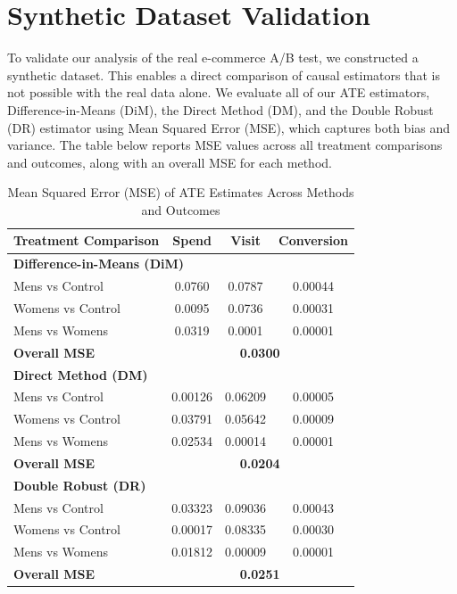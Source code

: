 \documentclass[10pt]{article}
\begin{document}
\section{Synthetic Dataset Validation}
To validate our analysis of the real e-commerce A/B test, we constructed a synthetic
dataset. This enables a direct comparison of causal estimators that is not possible
with the real data alone. We evaluate all of our ATE estimators, Difference-in-Means
(DiM), the Direct Method (DM), and the Double Robust (DR) estimator using Mean Squared
Error (MSE), which captures both bias and variance. The table below reports MSE values
across all treatment comparisons and outcomes, along with an overall MSE for each
method.
\begin{table}[h!]
\centering
\renewcommand{\arraystretch}{1.15}
\begin{tabular}{lccc}
\hline
\textbf{Treatment Comparison} & \textbf{Spend} & \textbf{Visit} & \textbf{Conversion}
\\
\hline
\multicolumn{4}{l}{\textbf{Difference-in-Means (DiM)}} \\
Mens vs Control & 0.0760 & 0.0787 & 0.00044 \\
Womens vs Control & 0.0095 & 0.0736 & 0.00031 \\
Mens vs Womens & 0.0319 & 0.0001 & 0.00001 \\
\textbf{Overall MSE} & \multicolumn{3}{c}{\textbf{0.0300}} \\
\hline
\multicolumn{4}{l}{\textbf{Direct Method (DM)}} \\
Mens vs Control & 0.00126 & 0.06209 & 0.00005 \\
Womens vs Control & 0.03791 & 0.05642 & 0.00009 \\
Mens vs Womens & 0.02534 & 0.00014 & 0.00001 \\
\textbf{Overall MSE} & \multicolumn{3}{c}{\textbf{0.0204}} \\
\hline
\multicolumn{4}{l}{\textbf{Double Robust (DR)}} \\
Mens vs Control & 0.03323 & 0.09036 & 0.00043 \\
Womens vs Control & 0.00017 & 0.08335 & 0.00030 \\
Mens vs Womens & 0.01812 & 0.00009 & 0.00001 \\
\textbf{Overall MSE} & \multicolumn{3}{c}{\textbf{0.0251}} \\
\hline
\end{tabular}
\caption{Mean Squared Error (MSE) of ATE Estimates Across Methods and Outcomes}
\label{tab:mse_all_methods}
\end{table}
\end{document}

